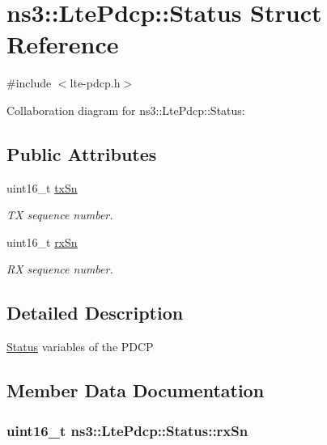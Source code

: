 \hypertarget{structns3_1_1LtePdcp_1_1Status}{}\section{ns3\+:\+:Lte\+Pdcp\+:\+:Status Struct Reference}
\label{structns3_1_1LtePdcp_1_1Status}


{\ttfamily \#include $<$lte-\/pdcp.\+h$>$}



Collaboration diagram for ns3\+:\+:Lte\+Pdcp\+:\+:Status\+:
\subsection*{Public Attributes}
\begin{DoxyCompactItemize}
\item 
uint16\+\_\+t \hyperlink{structns3_1_1LtePdcp_1_1Status_ac76e0dcd8b29a6a13db69624a698d6e8}{tx\+Sn}
\begin{DoxyCompactList}\small\item\em TX sequence number. \end{DoxyCompactList}\item 
uint16\+\_\+t \hyperlink{structns3_1_1LtePdcp_1_1Status_a42ca37750b85f1f392d3d8dc3c7ad861}{rx\+Sn}
\begin{DoxyCompactList}\small\item\em RX sequence number. \end{DoxyCompactList}\end{DoxyCompactItemize}


\subsection{Detailed Description}
\hyperlink{structns3_1_1LtePdcp_1_1Status}{Status} variables of the P\+D\+CP 

\subsection{Member Data Documentation}
\subsubsection[{\texorpdfstring{rx\+Sn}{rxSn}}]{\setlength{\rightskip}{0pt plus 5cm}uint16\+\_\+t ns3\+::\+Lte\+Pdcp\+::\+Status\+::rx\+Sn}\hypertarget{structns3_1_1LtePdcp_1_1Status_a42ca37750b85f1f392d3d8dc3c7ad861}{}\label{structns3_1_1LtePdcp_1_1Status_a42ca37750b85f1f392d3d8dc3c7ad861}


